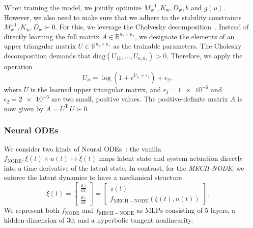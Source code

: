 
When training the model, we jointly optimize $M_\mathrm{w}^{-1}, K_\mathrm{w}, D_\mathrm{w}, b$ and $g(u)$. 
However, we also need to make sure that we adhere to the stability constraints  $M_\mathrm{w}^{-1}, K_\mathrm{w}, D_\mathrm{w} \succ 0$. For this, we leverage the Cholvesky decomposition~\cite{petersen2008matrix}. Instead of directly learning the full matrix $A \in \mathbb{R}^{n_z \times n_z}$, we designate the elements of an upper triangular matrix $U \in \mathbb{R}^{n_z \times n_z}$ as the trainable parameters.
The Cholesky decomposition demands that $\mathrm{diag}(U_{11}, \dots, U_{n_z n_z}) > 0$. Therefore, we apply the operation
\begin{equation}
    U_{ii} = \log \left (1+ e^{\breve{U}_{ii} + \epsilon_1} \right ) + \epsilon_2,
\end{equation}
where $\breve{U}$ is the learned upper triangular matrix, and $\epsilon_1 = \num{1e-6}$ and $\epsilon_2 = \num{2e-6}$ are two small, positive values.
The positive-definite matrix $A$ is now given by $A = U^\mathrm{T} \, U \succ 0$.

\subsubsection{Neural ODEs}
We consider two kinds of Neural ODEs~\cite{chen2018neural}: the vanilla $f_\mathrm{NODE}: \xi(t) \times u(t) \mapsto \dot{\xi}(t)$ maps latent state and system actuation directly into a time derivative of the latent state. In contrast, for the \emph{MECH-NODE}, we enforce the latent dynamics to have a mechanical structure
\begin{equation}
    \dot{\xi}(t) = \begin{bmatrix}
        \frac{\mathrm{d} z}{\mathrm{d}t}\\
        \frac{\mathrm{d} \dot{z}}{\mathrm{d}t}
    \end{bmatrix} = \begin{bmatrix}
        \dot{z}(t)\\
        f_\mathrm{MECH-NODE}(\xi(t), u(t))
    \end{bmatrix}.
\end{equation}
We represent both $f_\mathrm{NODE}$ and $f_\mathrm{MECH-NODE}$ as \glspl{MLP} consisting of $5$ layers, a hidden dimension of $30$, and a hyperbolic tangent nonlinearity.

